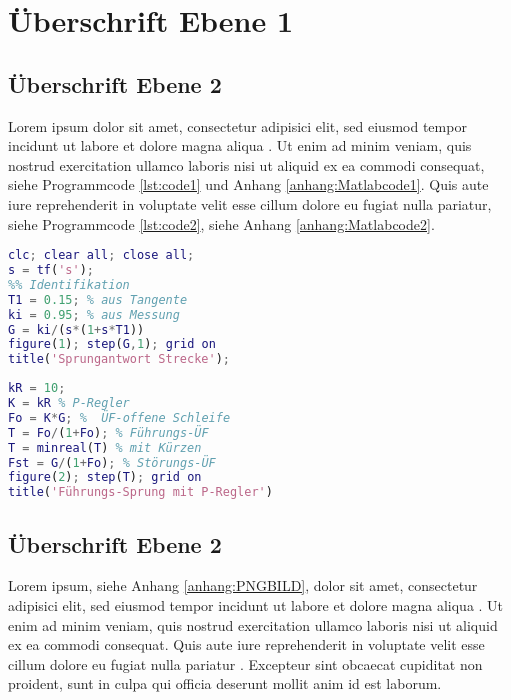 \section{Überschrift Ebene 1}

\lipsum[1][1-8]

\subsection{Überschrift Ebene 2}

Lorem ipsum dolor sit amet, consectetur adipisici elit, sed eiusmod tempor incidunt ut labore
et dolore magna aliqua \cite{publikation:publikationtitel1}. Ut enim ad minim veniam, quis nostrud exercitation ullamco
laboris nisi ut aliquid ex ea commodi consequat, siehe Programmcode \ref{lst:code1} und Anhang \ref{anhang:Matlabcode1}. Quis aute iure
reprehenderit in voluptate velit esse cillum dolore eu fugiat nulla pariatur, siehe
Programmcode \ref{lst:code2}, siehe Anhang \ref{anhang:Matlabcode2}.

\begin{lstlisting}[language=Matlab,caption={Beschriftung des eigenen Programmcodes.},label={lst:code1}]
% MATLAB-Code Bsp 3.5 IT1-Strecke
clc; clear all; close all;
s = tf('s');
%% Identifikation
T1 = 0.15; % aus Tangente
ki = 0.95; % aus Messung
G = ki/(s*(1+s*T1))
figure(1); step(G,1); grid on
title('Sprungantwort Strecke');
\end{lstlisting}

\begin{lstlisting}[language=Matlab,caption={Beschriftung des übernommenen Programmcodes\cite{publikation:publikationtitel1}.},label={lst:code2}]
%% Std-Regelkreis
kR = 10;
K = kR % P-Regler
Fo = K*G; %  ÜF-offene Schleife
T = Fo/(1+Fo); % Führungs-ÜF
T = minreal(T) % mit Kürzen
Fst = G/(1+Fo); % Störungs-ÜF 
figure(2); step(T); grid on
title('Führungs-Sprung mit P-Regler')
\end{lstlisting}

\subsection{Überschrift Ebene 2}

Lorem ipsum, siehe Anhang \ref{anhang:PNGBILD}, dolor sit amet, consectetur adipisici elit, sed eiusmod tempor incidunt ut labore
et dolore magna aliqua \cite{publikation:publikationtitel1}. Ut enim ad minim veniam, quis nostrud exercitation ullamco
laboris nisi ut aliquid ex ea commodi consequat. Quis aute iure reprehenderit in voluptate
velit esse cillum dolore eu fugiat nulla pariatur \cite{buch:buchtitel1}. Excepteur sint obcaecat cupiditat non
proident, sunt in culpa qui officia deserunt mollit anim id est laborum.
